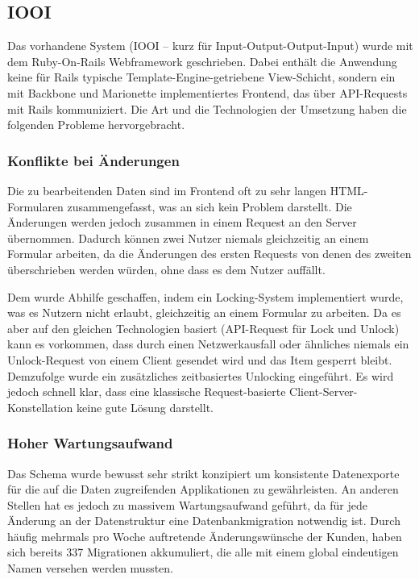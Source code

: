 \subsection{IOOI}
\label{ssec:ep_iooi}

Das vorhandene System (IOOI -- kurz für Input-Output-Output-Input) wurde mit
dem Ruby-On-Rails Webframework geschrieben.  Dabei enthält die Anwendung keine
für Rails typische Template-Engine-getriebene View-Schicht, sondern ein mit
Backbone und Marionette \cite{marionette} implementiertes Frontend, das über
API-Requests mit Rails kommuniziert.  Die Art und die Technologien der Umsetzung
haben die folgenden Probleme hervorgebracht.

\subsubsection{Konflikte bei Änderungen}
\label{sssec:epv_konflikte_bei_aenderungen}

Die zu bearbeitenden Daten sind im Frontend oft zu sehr langen HTML-Formularen
zusammengefasst, was an sich kein Problem darstellt.  Die Änderungen werden
jedoch zusammen in einem Request an den Server übernommen.  Dadurch können zwei
Nutzer niemals gleichzeitig an einem Formular arbeiten, da die Änderungen des
ersten Requests von denen des zweiten überschrieben werden würden, ohne dass es
dem Nutzer auffällt.

Dem wurde Abhilfe geschaffen, indem ein Locking-System implementiert wurde, was
es Nutzern nicht erlaubt, gleichzeitig an einem Formular zu arbeiten.  Da es
aber auf den gleichen Technologien basiert (API-Request für Lock und Unlock)
kann es vorkommen, dass durch einen Netzwerkausfall oder ähnliches niemals ein
Unlock-Request von einem Client gesendet wird und das Item gesperrt bleibt.
Demzufolge wurde ein zusätzliches zeitbasiertes Unlocking eingeführt.  Es wird
jedoch schnell klar, dass eine klassische Request-basierte
Client-Server-Konstellation keine gute Lösung darstellt.

\subsubsection{Hoher Wartungsaufwand}
\label{sssec:epv_hoher_wartungsaufwand}

Das Schema wurde bewusst sehr strikt konzipiert um konsistente Datenexporte für
die auf die Daten zugreifenden Applikationen zu gewährleisten.  An anderen
Stellen hat es jedoch zu massivem Wartungsaufwand geführt, da für jede Änderung
an der Datenstruktur eine Datenbankmigration notwendig ist.  Durch häufig
mehrmals pro Woche auftretende Änderungswünsche der Kunden, haben sich bereits
337 Migrationen akkumuliert, die alle mit einem global eindeutigen Namen
versehen werden mussten.


